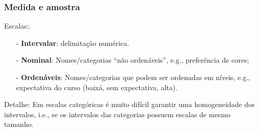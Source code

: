\documentclass[graphics,14pt]{beamer}
\begin{document}
\begin{frame}
\frametitle{Medida e amostra}
	Escalas:.\\
	\begin{itemize}
		\item[-] \textbf{Intervalar}: delimitação numérica.
		\item[-] \textbf{Nominal}: Nomes/categorias ``não ordenáveis'', e.g., preferência de cores;
		\item[-] \textbf{Ordenáveis}: Nomes/categorias que podem ser ordenadas em níveis, e.g., expectativa do curso (baixá, sem expectativa, alta).	
	\end{itemize}
	
	Detalhe: Em escalas categóricas é muito difícil garantir uma homogeneidade dos intervalos, i.e., se os intervalos das categorias possuem escalas de mesmo tamanho.
	
	

\end{frame}
\end{document}
